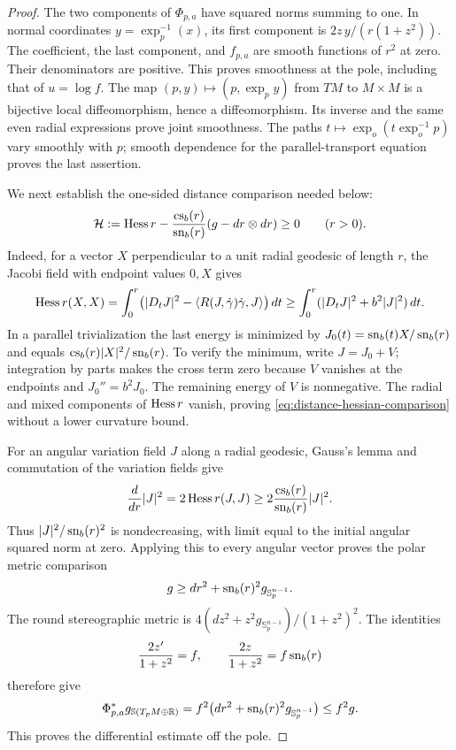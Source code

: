 \begin{proof}
The two components of $\Phi_{p,a}$ have squared norms summing to one.
In normal coordinates $y=\exp_p^{-1}(x)$, its first component is
$2z\,y/(r(1+z^2))$. The coefficient, the last component, and $f_{p,a}$
are smooth functions of $r^2$ at zero. Their denominators are positive.
This proves smoothness at the pole, including that of $u=\log f$.
The map $(p,y)\mapsto(p,\exp_p y)$ from $TM$ to $M\times M$ is a
bijective local diffeomorphism, hence a diffeomorphism. Its inverse
and the same even radial expressions prove joint smoothness.
The paths $t\mapsto\exp_o(t\exp_o^{-1}p)$ vary smoothly with $p$;
smooth dependence for the parallel-transport equation proves the
last assertion.

We next establish the one-sided distance comparison needed below:
\begin{equation}\label{eq:distance-hessian-comparison}
 \mathcal H:=\operatorname{Hess} r-\frac{\operatorname{cs}_b(r)}{\operatorname{sn}_b(r)}
                         (g-dr\otimes dr)\ge0\qquad(r>0).
\end{equation}
Indeed, for a vector $X$ perpendicular to a unit radial geodesic of
length $r$, the Jacobi field with endpoint values $0,X$ gives
\[
 \operatorname{Hess} r(X,X)
 =\int_0^r\bigl(|D_tJ|^2-\langle R(J,\dot\gamma)\dot\gamma,J\rangle\bigr)\,dt
 \ge\int_0^r(|D_tJ|^2+b^2|J|^2)\,dt.
\]
In a parallel trivialization the last energy is minimized by
$J_0(t)=\operatorname{sn}_b(t)X/\operatorname{sn}_b(r)$ and equals
$\operatorname{cs}_b(r)|X|^2/\operatorname{sn}_b(r)$. To verify the minimum, write $J=J_0+V$;
integration by parts makes the cross term zero because $V$ vanishes
at the endpoints and $J_0''=b^2J_0$. The remaining energy of $V$ is
nonnegative. The radial and mixed components of $\operatorname{Hess} r$ vanish,
proving \eqref{eq:distance-hessian-comparison} without a lower
curvature bound.

For an angular variation field $J$ along a radial geodesic, Gauss's
lemma and commutation of the variation fields give
\[
 \frac d{dr}|J|^2=2\operatorname{Hess} r(J,J)
 \ge2\frac{\operatorname{cs}_b(r)}{\operatorname{sn}_b(r)}|J|^2.
\]
Thus $|J|^2/\operatorname{sn}_b(r)^2$ is nondecreasing, with limit equal to the
initial angular squared norm at zero. Applying this to every angular
vector proves the polar metric comparison
\begin{equation}\label{eq:polar-comparison}
 g\ge dr^2+\operatorname{sn}_b(r)^2g_{\mathbb S_p^{n-1}}.
\end{equation}
The round stereographic metric is
$4(dz^2+z^2g_{\mathbb S_p^{n-1}})/(1+z^2)^2$.
The identities
\[
 \frac{2z'}{1+z^2}=f,\qquad
 \frac{2z}{1+z^2}=f\operatorname{sn}_b(r)
\]
therefore give
\begin{equation}\label{eq:map-pullback}
 \Phi_{p,a}^*g_{\mathbb S(T_pM\oplus\mathbb R)}
 =f^2\bigl(dr^2+\operatorname{sn}_b(r)^2g_{\mathbb S_p^{n-1}}\bigr)\le f^2g.
\end{equation}
This proves the differential estimate off the pole.


\end{proof}
